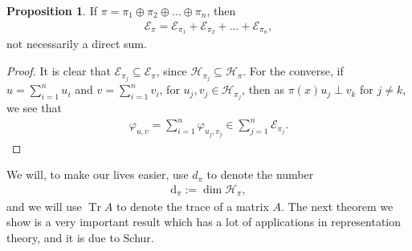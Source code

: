 \documentclass[10pt,twoside,openany,final]{memoir}
\theoremstyle{definition}
\newtheorem{proposition}[theorem]{Proposition}
\theoremstyle{Break}
\renewcommand{\H}{\mathcal{H}}
\renewcommand{\d}{\mathrm{d}}
\DeclareMathOperator{\tr}{Tr}
\begin{document}
\begin{proposition}
	If $\pi=\pi_1 \oplus \pi_2 \oplus \dots \oplus \pi_n$, then 
	\begin{align*}
		\mathcal{E}_\pi = \mathcal{E}_{\pi_{1}}+\mathcal{E}_{\pi_{2}}+\dots+\mathcal{E}_{\pi_{n}},
	\end{align*}
	not necessarily a direct sum.
	\label{5.7}
\end{proposition}
\begin{proof}
	It is clear that $\mathcal{E}_{\pi_j}\subseteq \mathcal{E}_\pi$, since $\H_{\pi_j}\subseteq \H_\pi$. For the converse, if $u= \sum_{i=1}^n u_i$ and $v = \sum_{i=1}^n v_i$, for $u_j,v_j \in \H_{\pi_j}$, then as $\pi(x)u_j \perp v_k$ for $j\neq k$, we see that
	\begin{align*}
		\varphi_{u,v}=\sum_{i=1}^n \varphi_{u_j,v_j}\in \sum_{j=1}^n \mathcal{E}_{\pi_j}.
	\end{align*}
\end{proof}

We will, to make our lives easier, use $d_\pi$ to denote the number
\begin{align*}
	\d_\pi:= \dim \H_\pi,
\end{align*}
and we will use $\tr A$ to denote the trace of a matrix $A$. The next theorem we show is a very important result which has a lot of applications in representation theory, and it is due to Schur.
\end{document}
